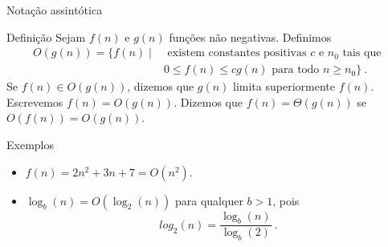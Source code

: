 \begin{frame}{Notação assintótica}

    \begin{block}{Definição}
        Sejam $f(n)$ e $g(n)$ funções não negativas. Definimos
        \begin{align*}
            O(g(n)) = \{ f(n) \mid &\text{ existem constantes positivas } c \text{ e } n_0 \text{ tais que } \\
            &  0 \leq f(n) \leq cg(n)  \text{ para todo } n \geq n_0 \} \ . 
        \end{align*}
        Se $f(n) \in O(g(n))$, dizemos que $g(n)$ limita superiormente $f(n)$. Escrevemos $f(n) = O(g(n))$. Dizemos que $f(n) = \Theta(g(n))$ se $O(f(n)) = O(g(n))$.
    \end{block}

    \begin{block}{Exemplos}
        \begin{itemize}
            \item[(i)] $f(n) = 2n^2 + 3n + 7 = O(n^2)$.
            
            \item[(ii)] $\log_b(n) = O(\log_2(n))$ para qualquer $b > 1$, pois
                \[ log_2(n) = \frac{\log_b(n)}{\log_b(2)} \ . \]
        \end{itemize}
        
    \end{block}

\end{frame}

